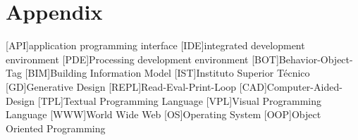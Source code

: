 \documentclass{./llncs2e/llncs}
\begin{document}
\section{Appendix}
\label{sec:attachments}

\begin{acronym}
	[API]{application programming interface}
	[IDE]{integrated development environment}
	[PDE]{Processing development environment}
	[BOT]{Behavior-Object-Tag}
	[BIM]{Building Information Model}
	[IST]{Instituto Superior Técnico}
	[GD]{Generative Design}
	[REPL]{Read-Eval-Print-Loop}
	[CAD]{Computer-Aided-Design}
	[TPL]{Textual Programming Language}
	[VPL]{Visual Programming Language}
	[WWW]{World Wide Web}
	[OS]{Operating System}
	[OOP]{Object Oriented Programming}
\end{acronym}

% 
% 
 

 
\end{document}
